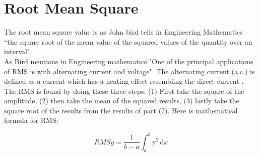 \section{Root Mean Square}
The root mean square value is as John bird tells in Engineering Mathematics \citep{Bird2007} “the square root of the mean value of the squared values of the quantity over an interval".
\\
As Bird mentions in Engineering mathematics "One of the principal applications of RMS is with alternating current and voltage". \citep{Bird2007} The alternating current (a.c.) is defined as a current which has a heating effect resembling the direct current \citep{Bird2007}.
\\
The RMS is found by doing these three steps:
(1) First take the square of the amplitude, (2) then take the mean of the squared results, (3) lastly take the square root of the results from the results of part (2)\citep{Bird2007}. Here is \cite{Bird2007} mathematical formula for RMS:

\begin{equation}\label{eq:RMS formular}
RMSy = \frac{1}{b-a}\int_a^b\mathrm{y}^{2}\,\mathrm{d}x
\end{equation}

